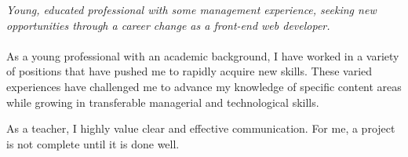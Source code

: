 
\vspace{-1.3em} %

\begin{multicols}{2}  %
\noindent \textit{Young, educated professional with some management experience, seeking new opportunities through a career change as a front-end web developer.}\\\\



As a young professional with an academic background, I have worked in a variety of positions that have pushed me to rapidly acquire new skills. These varied experiences have challenged me to advance my knowledge of specific content areas while growing in transferable managerial and technological skills. 


As a teacher, I  highly value clear and effective communication. For me, a project is not complete until it is done well.





\end{multicols}

